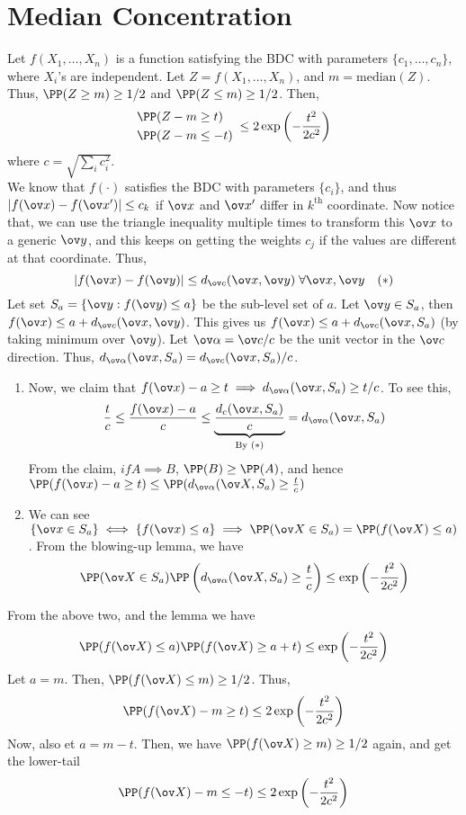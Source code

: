 \section{Median Concentration}
\begin{eg}
Let $f(X_1, \dots, X_n)$ is a function satisfying the BDC with parameters $\{c_1, \dots, c_n\}$, where $X_i$'s are independent. Let $Z = f(X_1, \dots, X_n)$, and $m = \text{median}(Z)$. Thus, $\PP(Z \geq m) \geq 1/2$ and $\PP(Z \leq m) \geq 1/2$. Then,
\begin{equation}
    \begin{split}
        &\PP(Z - m \geq t) \\
        &\PP(Z - m \leq -t)
    \end{split}
    \; \leq 2\exp\left(-\frac{t^2}{2c^2}\right)
\end{equation}
where $c = \sqrt{\sum_i c_i^2}$. \\
We know that $f(\cdot)$ satisfies the BDC with parameters $\{c_i\}$, and thus $|f(\ov x) - f(\ov x')| \leq c_k$ if $\ov x$ and $\ov x'$ differ in $k^\text{th}$ coordinate. Now notice that, we can use the triangle inequality multiple times to transform this $\ov x$ to a generic $\ov y$, and this keeps on getting the weights $c_j$ if the values are different at that coordinate. Thus,
\[
|f(\ov x) - f(\ov y)| \leq d_{\ov c} (\ov x, \ov y) \; \forall \ov x, \ov y \quad (*)
\]
Let set $S_a = \{\ov y: f(\ov y) \leq a\}$ be the sub-level set of $a$. Let $\ov y \in S_a$, then $f(\ov x) \leq a +d_{\ov c} (\ov x, \ov y)$. This gives us $f(\ov x) \leq a + d_{\ov c} (\ov x, S_a)$ (by taking minimum over $\ov y$). Let $\ov \alpha = \ov c /c$ be the unit vector in the $\ov c$ direction. Thus, $d_{\ov \alpha} (\ov x, S_a) = d_{\ov c} (\ov x, S_a)/c$. 
\begin{enumerate}[label=(\roman*)]
    \item Now, we claim that $f(\ov x) - a \geq t  \implies d_{\ov \alpha} (\ov x, S_a) \geq t/c$. To see this,
\[
\frac{t}{c} \leq \frac{f(\ov x) - a}{c} \leq \underbrace{\frac{d_{c}(\ov x, S_a)}{c}}_{\text{By }(*)} = d_{\ov \alpha} (\ov x, S_a)
\]
From the claim, $if A \implies B$, $\PP(B) \geq \PP(A)$, and hence $\PP(f(\ov x) - a \geq t) \leq \PP(d_{\ov\alpha}(\ov X, S_a) \geq \frac{t}{c})$
\item We can see $\{\ov x \in S_a\} \iff \{ f(\ov x) \leq a\} \implies \PP(\ov X \in S_a) = \PP(f(\ov X) \leq a)$. From the blowing-up lemma, we have
\[
\PP(\ov X \in S_a) \PP\left(d_{\ov \alpha} (\ov X, S_a) \geq \frac tc\right) \leq \exp\left(-\frac{t^2}{2c^2}\right)
\]
\end{enumerate}
From the above two, and the lemma we have
\[
\PP(f(\ov X) \leq a) \PP(f(\ov X) \geq a + t) \leq \exp\left(-\frac{t^2}{2c^2}\right)
\]
Let $a = m$. Then, $\PP(f(\ov X) \leq m) \geq 1/2$. Thus, 
\[
\PP(f(\ov X) -m \geq t) \leq 2 \exp\left(-\frac{t^2}{2c^2}\right)
\]
Now, also et $a = m- t$. Then, we have $\PP(f(\ov X) \geq m) \geq 1/2$ again, and get the lower-tail
\[
\PP(f(\ov X) -m \leq -t) \leq 2 \exp\left(-\frac{t^2}{2c^2}\right)
\]
\end{eg}
